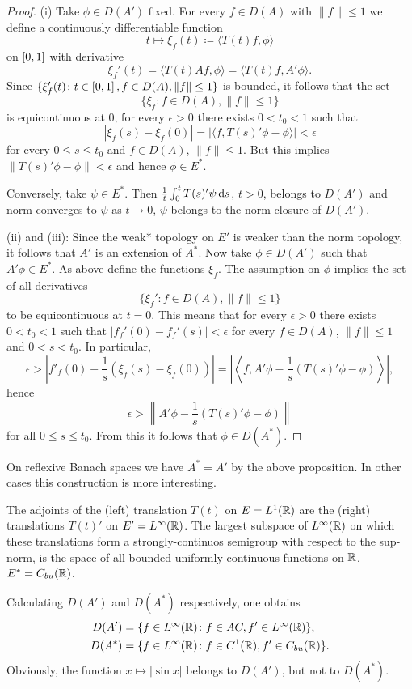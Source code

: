 \begin{proof}
(i) Take $\phi \in D(A')$ fixed.
For every $f \in D(A)$ with $\|f\| \leq 1$ we define a continuously differentiable function
\[
    t \mapsto \xi_{f}(t) \coloneq \langle T(t)f,\phi \rangle
\]
on $\left[ 0,1 \right]$ with derivative 
%
\[
	\xi_{f}'(t) = \langle T(t)Af,\phi \rangle = \langle T(t)f,A'\phi \rangle .
\]
%
Since $\{\xi_{f}'(t) \colon t \in \interval{0,1}, f \in D(A), \|f\| \leq 1\}$ is bounded, it follows that the set
\[
    \{\xi_{f} \colon f \in D(A), \|f\| \leq 1\}
\]
is equicontinuous at $0$, \ie for every $\epsilon > 0$ there exists $0 < t_{0} < 1$ such that
\[
    |\xi_{f}(s) - \xi_{f}(0)| = |\langle f,T(s)'\phi - \phi \rangle| < \epsilon
\]
for every $0 \leq s \leq t_{0}$ and $f \in D(A)$, $\|f\| \leq 1$.
But this implies $\|T(s)'\phi - \phi\| < \epsilon$ and hence $\phi \in E^{*}$.

Conversely, take $\psi \in E^{*}$.
Then $\frac{1}{t}\int_{0}^{t} T(s)'\psi \mathop{}\!\mathrm{d}{s}$, $t > 0$, belongs to $D(A')$ and norm converges to $\psi$ as $t \to 0$, \ie $\psi$ belongs to the norm closure of\/ $D(A')$.

(ii) and (iii): Since the weak* topology on $E'$ is weaker than the norm topology, it follows that $A'$ is an extension of\/ $A^{*}$.
Now take $\phi \in D(A')$ such that $A'\phi \in E^{*}$.
As above define the functions $\xi_{f}$. 
The assumption on $\phi$ implies the set of all derivatives
\[
\{\xi_{f}' \colon f \in D(A), \|f\| \leq 1\}
\]
to be equicontinuous at $t = 0$. 
This means that for every $\epsilon > 0$ there exists $0 < t_{0} < 1$ such that $|f_f'(0) - f_f'(s)| < \epsilon$ for every $f \in D(A)$, $\|f\| \leq 1$ and $0 < s < t_{0}$.
In particular,
\[
    \epsilon > \left\lvert f'_f(0) - \frac{1}{s}(\xi_f(s)-\xi_f(0)) \right\rvert 
    = \left\lvert \left\langle f,A'\phi - \frac{1}{s}(T(s)'\phi-\phi) \right\rangle \right\rvert ,
\]
hence
\[
    \epsilon > \left\|A'\phi - \frac{1}{s}(T(s)'\phi-\phi) \right\|
\]
for all $0 \leq s \leq t_{0}$.
From this it follows that $\phi \in D(A^*)$.
\end{proof}
On reflexive Banach spaces we have $A^* = A'$ by the above proposition.
In other cases this construction is more interesting.
\begin{example*}[continued]\label{ex:a1-3.4}
The adjoints of the (left) translation $T(t)$ on $E = L^1(\mathbb{R})$ are the (right) translations $T(t)'$ on $E' = L^\infty(\mathbb{R})$.
The largest subspace of\/ $L^\infty(\mathbb{R})$ on which these translations form a strongly-continuos semigroup with respect to the sup-norm, is the space of all bounded uniformly continuous functions on $\mathbb{R}$, \ie $E^* = C_{bu}(\mathbb{R})$.

Calculating $D(A')$ and $D(A^*)$ respectively, one obtains
\begin{align*}
    D(A') &= \{f \in L^\infty(\mathbb{R}) \colon f \in AC, f' \in L^\infty(\mathbb{R})\}, \\
    D(A^*) &= \{f \in L^\infty(\mathbb{R}) \colon f \in C^1(\mathbb{R}), f' \in C_{bu}(\mathbb{R})\}.
\end{align*}
Obviously, the function $x \mapsto |\sin x|$ belongs to $D(A')$, but not to $D(A^*)$.
\end{example*}
